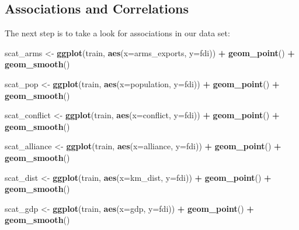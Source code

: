 \documentclass[11pt,]{article}
\newenvironment{Shaded}{\begin{snugshade}}{\end{snugshade}}
\newcommand{\DataTypeTok}[1]{\textcolor[rgb]{0.13,0.29,0.53}{#1}}
\newcommand{\KeywordTok}[1]{\textcolor[rgb]{0.13,0.29,0.53}{\textbf{#1}}}
\newcommand{\NormalTok}[1]{#1}
\newcommand{\OperatorTok}[1]{\textcolor[rgb]{0.81,0.36,0.00}{\textbf{#1}}}
\newcommand{\StringTok}[1]{\textcolor[rgb]{0.31,0.60,0.02}{#1}}
\begin{document}
\hypertarget{associations-and-correlations}{%
\subsection{Associations and
Correlations}\label{associations-and-correlations}}

The next step is to take a look for associations in our data set:

\begin{Shaded}
\begin{Highlighting}[]
\NormalTok{scat_arms <-}\StringTok{ }\KeywordTok{ggplot}\NormalTok{(train, }\KeywordTok{aes}\NormalTok{(}\DataTypeTok{x=}\NormalTok{arms_exports, }\DataTypeTok{y=}\NormalTok{fdi)) }\OperatorTok{+}
\StringTok{    }\KeywordTok{geom_point}\NormalTok{() }\OperatorTok{+}
\StringTok{    }\KeywordTok{geom_smooth}\NormalTok{()}

\NormalTok{scat_pop <-}\StringTok{ }\KeywordTok{ggplot}\NormalTok{(train, }\KeywordTok{aes}\NormalTok{(}\DataTypeTok{x=}\NormalTok{population, }\DataTypeTok{y=}\NormalTok{fdi)) }\OperatorTok{+}
\StringTok{    }\KeywordTok{geom_point}\NormalTok{() }\OperatorTok{+}
\StringTok{    }\KeywordTok{geom_smooth}\NormalTok{()}

\NormalTok{scat_conflict <-}\StringTok{ }\KeywordTok{ggplot}\NormalTok{(train, }\KeywordTok{aes}\NormalTok{(}\DataTypeTok{x=}\NormalTok{conflict, }\DataTypeTok{y=}\NormalTok{fdi)) }\OperatorTok{+}
\StringTok{    }\KeywordTok{geom_point}\NormalTok{() }\OperatorTok{+}
\StringTok{    }\KeywordTok{geom_smooth}\NormalTok{()}

\NormalTok{scat_alliance <-}\StringTok{ }\KeywordTok{ggplot}\NormalTok{(train, }\KeywordTok{aes}\NormalTok{(}\DataTypeTok{x=}\NormalTok{alliance, }\DataTypeTok{y=}\NormalTok{fdi)) }\OperatorTok{+}
\StringTok{    }\KeywordTok{geom_point}\NormalTok{() }\OperatorTok{+}
\StringTok{    }\KeywordTok{geom_smooth}\NormalTok{()}

\NormalTok{scat_dist <-}\StringTok{ }\KeywordTok{ggplot}\NormalTok{(train, }\KeywordTok{aes}\NormalTok{(}\DataTypeTok{x=}\NormalTok{km_dist, }\DataTypeTok{y=}\NormalTok{fdi)) }\OperatorTok{+}
\StringTok{    }\KeywordTok{geom_point}\NormalTok{() }\OperatorTok{+}
\StringTok{    }\KeywordTok{geom_smooth}\NormalTok{()}

\NormalTok{scat_gdp <-}\StringTok{ }\KeywordTok{ggplot}\NormalTok{(train, }\KeywordTok{aes}\NormalTok{(}\DataTypeTok{x=}\NormalTok{gdp, }\DataTypeTok{y=}\NormalTok{fdi)) }\OperatorTok{+}
\StringTok{    }\KeywordTok{geom_point}\NormalTok{() }\OperatorTok{+}
\StringTok{    }\KeywordTok{geom_smooth}\NormalTok{()}


\end{Highlighting}
\end{Shaded}
\end{document}
